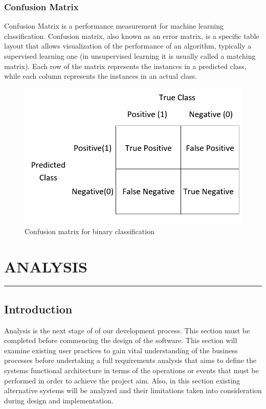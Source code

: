 \documentclass[12pt,a4paper]{report}
\begin{document}
\subsection{Confusion Matrix}
\justify Confusion Matrix is a performance measurement for machine learning classification. Confusion matrix, also known as an error matrix\cite{50_10}, is a specific table layout that allows visualization of the performance of an algorithm, typically a supervised learning one (in unsupervised learning it is usually called a matching matrix). Each row of the matrix represents the instances in a predicted class, while each column represents the instances in an actual class\cite{49_11}.
\begin{figure}[t]
	
	
	\includegraphics[width=\textwidth]{conf_matrix_t.png}
	\caption{ Confusion matrix for binary classification}
	\label{cnf_matrix_t}
\end{figure}

\newpage
	\chapter{ANALYSIS}
	\rule{14.6cm}{.05cm}
	\section{Introduction}
	\justify Analysis is the next stage of of our development process. This section must be completed before commencing the design of the software. This section will examine existing user practices to gain vital understanding of the business processes before undertaking a full requirements analysis that aims to define the systems functional architecture in terms of the operations or events that must be performed in order to achieve the project aim. Also, in this section existing alternative systems will be analyzed and their limitations taken into consideration during design and implementation.
\end{document}
